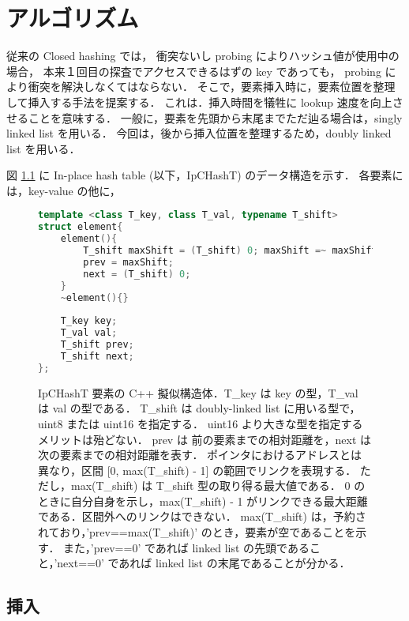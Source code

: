 \chapter{アルゴリズム}
\label{chap_Algorism}

従来の Closed hashing では，
衝突ないし probing によりハッシュ値が使用中の場合，
本来１回目の探査でアクセスできるはずの key であっても，
probing により衝突を解決しなくてはならない．
そこで，要素挿入時に，要素位置を整理して挿入する手法を提案する．
これは．挿入時間を犠牲に lookup 速度を向上させることを意味する．
一般に，要素を先頭から末尾までただ辿る場合は，singly linked list を用いる．
今回は，後から挿入位置を整理するため，doubly linked list を用いる．

図 \ref{fig_IpCHashT_struct} に In-place hash table (以下，IpCHashT) のデータ構造を示す．
各要素には，key-value の他に，

\begin{figure}[h] %
\begin{lstlisting}[language=C++]
template <class T_key, class T_val, typename T_shift>
struct element{
	element(){
		T_shift maxShift = (T_shift) 0; maxShift =~ maxShift;
		prev = maxShift;
		next = (T_shift) 0;
	}
	~element(){}
	
	T_key key;
	T_val val;
	T_shift prev;
	T_shift next;
};
\end{lstlisting}
\caption{
  IpCHashT 要素の C++ 擬似構造体．T\_key は key の型，T\_val は val の型である．
  T\_shift は doubly-linked list に用いる型で，uint8 または uint16 を指定する．
  uint16 より大きな型を指定するメリットは殆どない．
  prev は 前の要素までの相対距離を，next は 次の要素までの相対距離を表す．
  ポインタにおけるアドレスとは異なり，区間 [0, max(T\_shift) - 1] の範囲でリンクを表現する．
  ただし，max(T\_shift) は T\_shift 型の取り得る最大値である．
  0 のときに自分自身を示し，max(T\_shift) - 1 がリンクできる最大距離である．区間外へのリンクはできない．
  max(T\_shift) は，予約されており，'prev==max(T\_shift)' のとき，要素が空であることを示す．
  また，'prev==0' であれば linked list の先頭であること，'next==0' であれば linked list の末尾であることが分かる．
}
\label{fig_IpCHashT_struct}
\end{figure}



\section{挿入}

